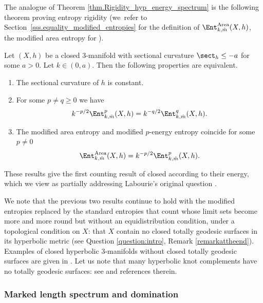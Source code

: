 The analogue of Theorem \ref{thm.Rigidity_hyp_energy_spectrum} is the following theorem proving entropy rigidity (we~refer to Section~\ref{sss.equality_modified_entropies} for the definition of $\Ent^\mathrm{Area}_{k,\hat m}(X,h)$, the modified area entropy for \ksurfaces).

\begin{theorem}\label{equality_energy_area}
Let $(X,h)$ be a closed $3$\nobreakdash-manifold with sectional curvature $\sect_h\leq -a$ for some $a>0$. Let $k\in (0,a)$. Then the following properties are equivalent.
\begin{enumerate}
\item The sectional curvature of $h$ is constant.
\item For some $p\neq q\geq 0$ we have
\[
k^{-p/2} \Ent^p_{k,\hat m}(X,h)=k^{-q/2}\Ent^q_{k,\hat m}(X,h).
\]

\item The modified area entropy and modified $p$-energy entropy coincide for some $p\neq 0$
\[
\Ent^\mathrm{Area}_{k,\hat m}(X,h)=k^{-p/2}\Ent^p_{k,\hat m}(X,h).
\]
\end{enumerate}
\end{theorem}

These results give the first counting result of closed \ksurfaces according to their energy, which we view as partially addressing Labourie's original question \cite[Quest.\,(ii) p.\,243]{LabourieInvent}.

We note that the previous two results continue to hold with the modified entropies replaced by the standard entropies that count \ksurfaces whose limit sets become more and more round but without an equidistribution condition, under a topological condition on $X$: that $X$ contain no closed totally geodesic surfaces in its hyperbolic metric (see Question \ref{question:intro}, Remark \ref{remarkattheend}). Examples of closed hyperbolic 3-manifolds without closed totally geodesic surfaces are given in \cite{MR03}. Let us note that many hyperbolic knot complements have no totally geodesic surfaces: see \cite{Basilio_Lee_Malionek,Reid} and references therein.


\subsubsection{Marked length spectrum and domination}

